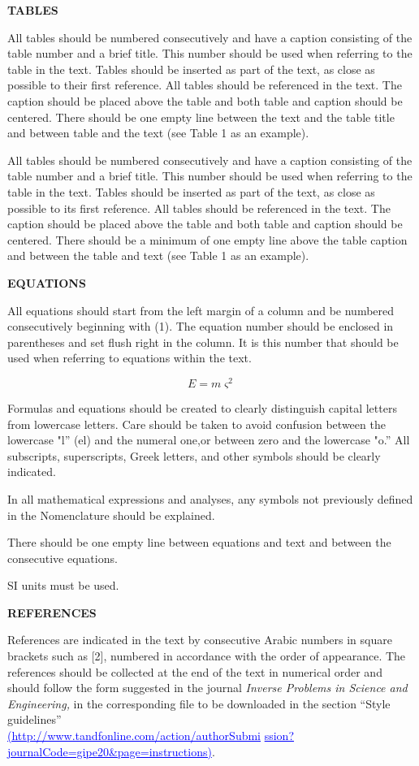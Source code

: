 \documentclass[conference,compsoc]{IEEEtran}
\begin{document}
\textbf{TABLES}

All tables should be numbered consecutively and have a caption consisting of the table number and a brief title. This number should be used when referring to the table in the text. Tables should be inserted as part of the text, as close as possible to their first reference. All tables should be referenced in the text. The caption should be placed above the table and both table and caption should be centered. There should be one empty line between the text and the table title and between table and the text (see Table 1 as an example).

All tables should be numbered consecutively and have a caption consisting of the table number and a brief title. This number should be used when referring to the table in the text. Tables should be inserted as part of the text, as close as possible to its first reference. All tables should be referenced in the text. The caption should be placed above the table and both table and caption should be centered. There should be a minimum of one empty line above the table caption and between the table and text (see Table 1 as an example).


\textbf{EQUATIONS}

All equations should start from the left margin of a column and be numbered consecutively beginning with (1). The equation number should be enclosed in parentheses and set flush right in the column. It is this number that should be used when referring to equations within the text.

\begin{equation}
\label{eq1}
E=m\varsigma^{2}
\end{equation}

Formulas and equations should be created to clearly distinguish capital letters from lowercase letters. Care should be taken to avoid confusion between the lowercase "l'' (el) and the numeral one,or between zero and the lowercase "o.'' All subscripts, superscripts, Greek letters, and other symbols should be clearly indicated.

In all mathematical expressions and analyses, any symbols not previously defined in the Nomenclature should be explained.

There should be one empty line between equations and text and between the consecutive equations.

SI units must be used.


\textbf{REFERENCES}

References are indicated in the text by consecutive Arabic numbers in square
brackets such as [2], numbered in accordance with the order of appearance.
The references should be collected at the end of the text in numerical order
and should follow the form suggested in the journal \textit{Inverse Problems in Science and Engineering,} in the corresponding
file to be downloaded in the section ``Style guidelines''\\
\textcolor{blue}{\underline{(http://www.tandfonline.com/action/authorSubmi}}
\textcolor{blue}{\underline{ssion?journalCode=gipe20\&page=instructions)}}.
\end{document}
